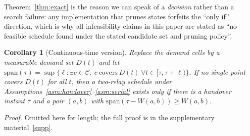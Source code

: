 \documentclass[11pt]{article}
\theoremstyle{dshplain}
\newtheorem{corollary}[theorem]{Corollary}
\theoremstyle{dshdefn}
\begin{document}
\noindent Theorem~\ref{thm:exact} is the reason we can speak of a
\emph{decision} rather than a search failure: any implementation that prunes
states forfeits the ``only if'' direction, which is why all infeasibility claims
in this paper are stated as ``no feasible schedule found under the stated
candidate set and pruning policy''.

\begin{corollary}[Continuous-time version]
\label{cor:continuous}
Replace the demand cells by a measurable demand set $D(t)$ and let
$\mathrm{span}(\tau)=\sup\{\ell:\exists c\in\mathcal{C},\ c\ \text{covers}\
D(t)\ \forall t\in[\tau,\tau+\ell)\}$. If no single point covers
$D(t)$ for all $t$, then a two-relay schedule under
Assumptions~\ref{asm:handover}--\ref{asm:serial} exists only if there is a handover instant $\tau$ and a pair
$(a,b)$ with $\mathrm{span}(\tau-W(a,b))\ge W(a,b)$.
\end{corollary}
\noindent\emph{Proof.} Omitted here for length; the full proof is in the supplementary material~\ref{supp}.
\end{document}
